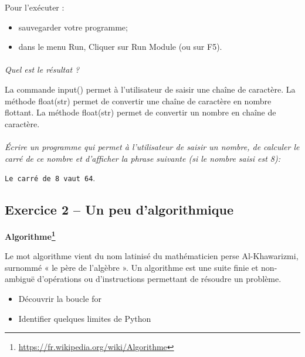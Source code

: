 \documentclass[11pt,oneside]{article}
\begin{document}
Pour l'exécuter :
\begin{itemize}
\item sauvegarder votre programme;
\item dans le menu Run, Cliquer sur Run Module (ou sur F5).
\end{itemize}

\paragraph{} 
\textit{Quel est le résultat ?}



La commande \textsf{input()} permet à l'utilisateur de saisir une chaîne de caractère. La méthode \textsf{float(str)} permet de convertir une chaîne de caractère en nombre flottant.
La méthode \textsf{float(str)} permet de convertir un nombre en chaîne de caractère.

\paragraph{}
\textit{Écrire un programme qui permet à l'utilisateur de saisir un nombre, de calculer le carré de ce nombre et d'afficher la phrase suivante (si le nombre saisi est 8):}

\texttt{Le carré de 8 vaut 64}.

\subsection*{Exercice 2 -- Un peu d'algorithmique}

\begin{defi}
\textbf{Algorithme\footnote{\url{https://fr.wikipedia.org/wiki/Algorithme}}}

Le mot algorithme vient du nom latinisé du mathématicien perse Al-Khawarizmi, surnommé « le père de l'algèbre ». Un algorithme est une suite finie et non-ambiguë d’opérations ou d'instructions permettant de résoudre un problème.
\end{defi}

\begin{obj}
\begin{itemize}
\item Découvrir la boucle \textsf{for}
\item Identifier quelques limites de Python
\end{itemize}

\end{obj}
\end{document}
